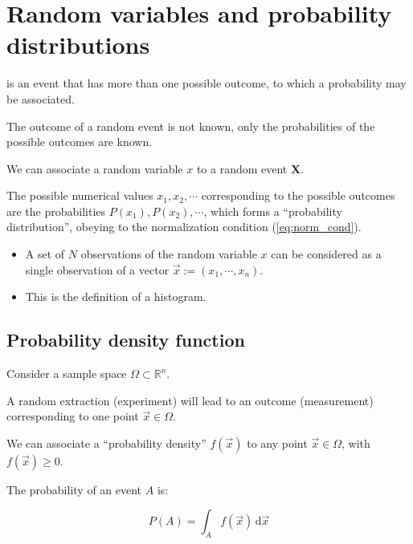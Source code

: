 

\section{Random variables and probability distributions}
\label{sec:rand_var}

 is an event that has more than one possible outcome, to which a probability may be associated.

The outcome of a random event is not known, only the probabilities of the possible outcomes are known.

We can associate a random variable $x$ to a random event $\mathbf{X}$.

The possible numerical values $x_{1}, x_{2}, \cdots$ corresponding to the possible outcomes are the probabilities $P(x_{1}), P(x_{2}), \cdots$, which forms a “probability distribution”, obeying to the normalization condition (\ref{eq:norm_cond}).


\begin{itemize}[$\to$]
	\item A set of $N$ observations of the random variable $x$ can be considered as a single observation of a vector $\vec{x} := (x_{1}, \cdots, x_{n})$.
	\item This is the definition of a histogram.
\end{itemize}

\subsection{Probability density function	}
\label{subsec:pdf}

Consider a sample space $\Omega \subset \mathbb{R}^{n}$.

A random extraction (experiment) will lead to an outcome (measurement) corresponding to one point $\vec{x} \in \Omega$.

We can associate a “probability density” $f(\vec{x})$ to any point $\vec{x} \in \Omega$, with $f(\vec{x}) \geq 0$.

The probability of an event $A$ is: 

\begin{equation}\label{eq:prob_event}
	P(A) = \int_{A} {f(\vec{x})} \,\mathrm{d}\vec{x}
\end{equation}

